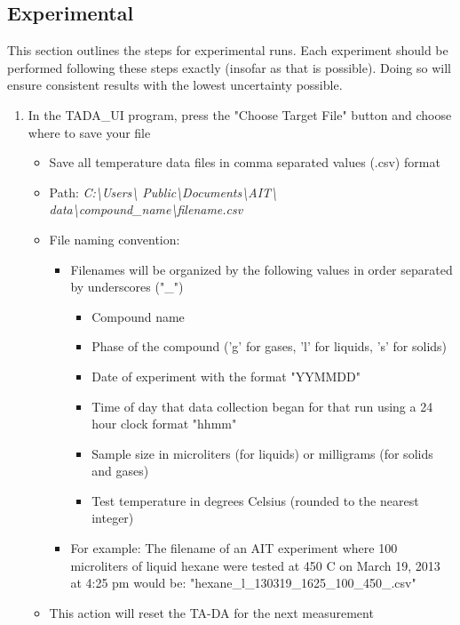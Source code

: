 \documentclass[letterpaper,11pt]{article}
\begin{document}
    \subsection{Experimental}
This section outlines the steps for experimental runs. Each experiment should be
performed following these steps exactly (insofar as that is possible). Doing so
will ensure consistent results with the lowest uncertainty possible.
    \begin{enumerate}
  
    \item In the TADA\_UI program, press the "Choose Target File" button and 
        choose where to save your file
        \begin{itemize}
        \item Save all temperature data files in comma separated values (.csv) 
            format
        \item Path: \textit{C:\textbackslash Users\textbackslash 
            Public\textbackslash Documents\textbackslash AIT\textbackslash 
            data\textbackslash compound\_name\textbackslash filename.csv}
        \item File naming convention: 
            \begin{itemize}
            \item Filenames will be organized by the following values in order 
                separated by underscores ("\_")
                    \begin{itemize}
                    \item Compound name
                    \item Phase of the compound ('g' for gases, 'l' for liquids,
                        's' for solids)
                    \item Date of experiment with the format "YYMMDD"
                    \item Time of day that data collection began for that run
                        using a 24 hour clock format "hhmm"
                    \item Sample size in microliters (for liquids) or milligrams
                        (for solids and gases)
                    \item Test temperature in degrees Celsius (rounded to the 
                        nearest integer)
                    \end{itemize}
                    
            \item For example: The filename of an AIT experiment where 100 
                microliters of liquid hexane were tested at 450 \degree C on 
                March 19, 2013 at 4:25 pm would be: \newline
                "hexane\_l\_130319\_1625\_100\_450\_.csv"
            \end{itemize}    
        \item This action will reset the TA-DA for the next measurement        
        \end{itemize}
    

\end{enumerate}
\end{document}
